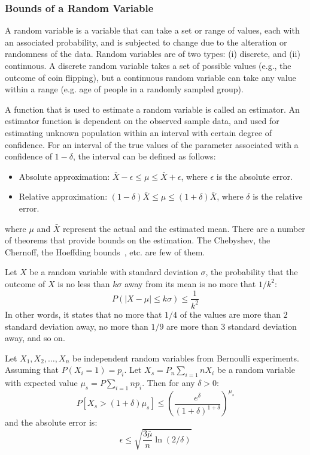 \subsubsection{Bounds of a Random Variable}
A random variable is a variable that can take a set or range of values, each with an associated probability, and is subjected to change due to the alteration or randomness of the data. Random variables are of two types: (i) discrete, and (ii) continuous. A discrete random variable takes a set of possible values (e.g., the outcome of coin flipping), but a continuous random variable can take any value within a range (e.g. age of people in a randomly sampled group).

A function that is used to estimate a random variable is called an estimator. An estimator function is dependent on the observed sample data, and used for estimating unknown population within an interval with certain degree of confidence. For an interval of the true values of the parameter associated with a confidence of $1 - \delta$, the interval can be defined as follows:
\begin{itemize}    
    \item Absolute approximation: $\bar{X} - \epsilon \le \mu \le \bar{X} + \epsilon$, where $\epsilon$ is the absolute error.
    \item Relative approximation: $(1 - \delta)\bar{X} \le \mu \le (1 + \delta)\bar{X}$, where $\delta$ is the relative error.
\end{itemize}
where $\mu$ and $\bar{X}$ represent the actual and the estimated mean. There are a number of theorems that provide bounds on the estimation. The Chebyshev, the Chernoff, the Hoeffding bounds~\cite{hoeffding63:bound}, etc. are few of them.

\begin{theorem}
\label{thm:chebyshev}
    Let $X$ be a random variable with standard deviation $\sigma$, the probability that the outcome of $X$ is no less than $k\sigma$ away from its mean is no more that $1/k^2$:
    \[
        P(|X-\mu| \le k\sigma) \le \frac{1}{k^2}
    \]
    In other words, it states that no more that $1/4$ of the values are more than $2$ standard deviation away, no more than $1/9$ are more than $3$ standard deviation away, and so on.
\end{theorem}

\begin{theorem}
\label{thm:chernoff}
    Let $X_1,X_2,\dots, X_n$ be independent random variables from Bernoulli experiments. Assuming that $P(X_i = 1) = p_i$. Let $X_s = P_n \sum_{i=1}{n} X_i$ be a random variable with expected value $\mu_s = P \sum_{i=1} np_i$. Then for any $\delta > 0$:
    \[
        P[X_s > (1+\delta) \mu_s] \le (\frac{e^\delta}{(1 + \delta)^{1 +\delta}} )  ^{\mu_s}
    \]
    and the absolute error is:
    \[
        \epsilon \le \sqrt{\frac{3 \bar{\mu}}{n} \ln (2/\delta)}
    \]
\end{theorem}

